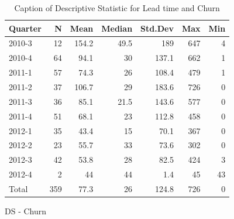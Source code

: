 \documentclass[UKenglish]{ifimaster}  %
\begin{document}
\begin{appendices}
\begin{table}[!htbp]
\begin{adjustwidth}{-1.5cm}{}
\begin{subfigure}[b]{0.3\textwidth}
{\begin{tabular}{ | l | r | r | r | r | r | r | }
 \hline
  \textbf{Quarter} &	\textbf{N} &	\textbf{Mean} &	\textbf{Median} & \textbf{Std.Dev} & \textbf{Max}	& \textbf{Min} \\ \hline
 2010-3   & 12 & 154.2 & 49.5 & 189 & 647 & 4 \\ \hline
 2010-4  & 64 & 94.1 & 30 & 137.1 & 662 & 1 \\ \hline
 2011-1  & 57 & 74.3 & 26 & 108.4 & 479 & 1 \\ \hline
 2011-2  & 37 & 106.7 & 29 & 183.6 & 726 & 0\\ \hline
 2011-3  & 36 & 85.1 & 21.5 & 143.6 & 577 & 0\\ \hline
 2011-4  & 51 & 68.1 & 23 & 112.8 & 458 & 0\\ \hline
 2012-1  & 35 & 43.4 & 15 & 70.1 & 367 & 0\\ \hline
 2012-2  & 23 & 55.7 & 33 & 73.6 & 302 & 0\\ \hline
 2012-3  & 42 & 53.8 & 28 & 82.5 & 424 & 3 \\ \hline
 2012-4  & 2 & 44 & 44 & 1.4 & 45 & 43 \\ \hline
 Total  & 359 & 77.3 & 26 & 124.8 & 726 & 0\\ \hline
\end{tabular}
}
\caption{DS - Churn}
 \label{DS:Churn:7}
\end{subfigure}
\end{adjustwidth}
\caption[Optional caption for list of figures]{Caption of Descriptive Statistic for Lead time and Churn}
\label{DS:7:3}
\end{table}


\end{appendices}
\end{document}
